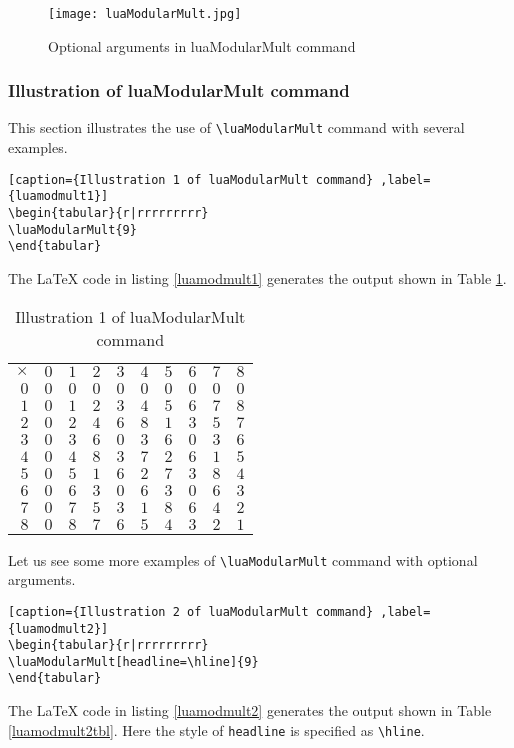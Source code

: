 ﻿\documentclass{article}
\begin{document}
\begin{figure}[!ht] %
  \centering
  \texttt{[image: luaModularMult.jpg]}
  \caption{Optional arguments in luaModularMult command}
  \label{fig:luaModularMult}
\end{figure}

\subsubsection{Illustration  of luaModularMult command}This section illustrates the use of \verb|\luaModularMult| command with several examples.
\begin{lstlisting}[caption={Illustration 1 of luaModularMult command} ,label={luamodmult1}]
\begin{tabular}{r|rrrrrrrrr}
\luaModularMult{9}
\end{tabular}
\end{lstlisting}

The LaTeX code in listing \ref{luamodmult1} generates the output shown in Table  \ref{luamodmult1tbl}.


\begin{table}[H]
\centering
\begin{tabular}{r|rrrrrrrrr}
$\times$ & $0$ & $1$ & $2$ & $3$ & $4$ & $5$ & $6$ & $7$ & $8$\\ $0$ & $0$ & $0$ & $0$ & $0$ & $0$ & $0$ & $0$ & $0$ & $0$\\ $1$ & $0$ & $1$ & $2$ & $3$ & $4$ & $5$ & $6$ & $7$ & $8$\\ $2$ & $0$ & $2$ & $4$ & $6$ & $8$ & $1$ & $3$ & $5$ & $7$\\ $3$ & $0$ & $3$ & $6$ & $0$ & $3$ & $6$ & $0$ & $3$ & $6$\\ $4$ & $0$ & $4$ & $8$ & $3$ & $7$ & $2$ & $6$ & $1$ & $5$\\ $5$ & $0$ & $5$ & $1$ & $6$ & $2$ & $7$ & $3$ & $8$ & $4$\\ $6$ & $0$ & $6$ & $3$ & $0$ & $6$ & $3$ & $0$ & $6$ & $3$\\ $7$ & $0$ & $7$ & $5$ & $3$ & $1$ & $8$ & $6$ & $4$ & $2$\\ $8$ & $0$ & $8$ & $7$ & $6$ & $5$ & $4$ & $3$ & $2$ & $1$
\end{tabular} 
\caption{Illustration 1 of luaModularMult command}
\label{luamodmult1tbl}
\end{table}

Let us see some more examples of \verb|\luaModularMult| command with optional arguments.
\begin{lstlisting}[caption={Illustration 2 of luaModularMult command} ,label={luamodmult2}]
\begin{tabular}{r|rrrrrrrrr}
\luaModularMult[headline=\hline]{9}
\end{tabular}
\end{lstlisting}
The LaTeX code in listing \ref{luamodmult2} generates the output shown in Table  \ref{luamodmult2tbl}. Here the style of \verb|headline| is specified as \verb|\hline|.
\end{document}
